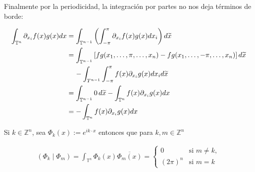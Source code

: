 \documentclass[12pt]{article}
\newcommand\T{\mathbb{T}}
\begin{document}
Finalmente por la periodicidad, la integración por partes no nos deja términos de borde:

    \begin{align*}
        \int_{\mathbb{T}^n} \partial_{x_i} f(x) g(x) d x&=\int_{\T ^{n-1}}\left(\int_{-\pi}^{\pi}\partial_{x_i} f(x) g(x)dx_{i}\right)d\widetilde{x}\\
        &=\int_{\T^{n-1}}\left[fg(x_1,\ldots,\pi,\ldots,x_n)-fg(x_1,\ldots,-\pi,\ldots,x_n)\right]d\widetilde{x}\\
        &\hspace*{0.4cm}-\int_{T^{n-1}}\int_{-\pi}^{\pi}f(x)\partial_{x_i}g(x)dx_id\widetilde{x}\\
        &=\int_{\T^{n-1}}0\,d\widetilde{x}-\int_{\T^n}f(x)\partial_{x_i}g(x)dx\\
        &=-\int_{\T^n}f(x)\partial_{x_i}g(x)dx
    \end{align*}


\begin{theorem}
Si $k \in \mathbb{Z}^n$, sea $\Phi_k(x):=e^{i k \cdot x}$ entonces que para $k, m \in \mathbb{Z}^n$

$$
\begin{array}{ll}
\displaystyle\left(\Phi_k \mid \Phi_m\right)=\int_{\T^n} \Phi_k(x) \overline{\Phi_m(x)}=\begin{cases}
0 \quad &\text{si }m\neq  k,\\
(2\pi)^n &\text{si } m=k
\end{cases}
\end{array}
$$
\end{theorem}
\end{document}
